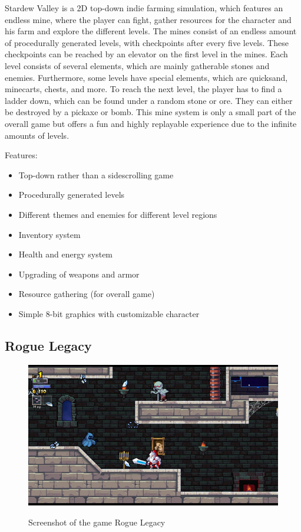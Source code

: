 \documentclass[12p]{article}
\begin{document}
Stardew Valley is a 2D top-down indie farming simulation, which features an endless mine, where the player can fight, gather resources for the character and his farm and explore the different levels. The mines consist of an endless amount of procedurally generated levels, with checkpoints after every five levels. These checkpoints can be reached by an elevator on the first level in the mines. Each level consists of several elements, which are mainly gatherable stones and enemies. Furthermore, some levels have special elements, which are quicksand, minecarts, chests, and more. To reach the next level, the player has to find a ladder down, which can be found under a random stone or ore. They can either be destroyed by a pickaxe or bomb. This mine system is only a small part of the overall game but offers a fun and highly replayable experience due to the infinite amounts of levels.

Features:

\begin{itemize}
  \item Top-down rather than a sidescrolling game
  \item Procedurally generated levels
  \item Different themes and enemies for different level regions
  \item Inventory system
  \item Health and energy system
  \item Upgrading of weapons and armor
  \item Resource gathering (for overall game)
  \item Simple 8-bit graphics with customizable character
\end{itemize}


\subsection{Rogue Legacy}

\begin{figure}[ht]
  \center
  \includegraphics[width=1\textwidth]{StateOfTheArtScreenshots/rogue_legacy}
  \label{StateOfTheArt_Screenshots_RogueLegacy}
  \caption{Screenshot of the game Rogue Legacy \cite{RogueLegacyScreenshot}}
\end{figure}
\end{document}
